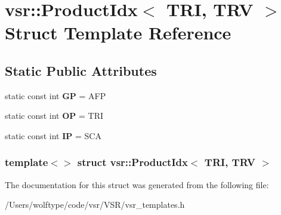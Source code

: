 \hypertarget{structvsr_1_1_product_idx_3_01_t_r_i_00_01_t_r_v_01_4}{\section{vsr\-:\-:Product\-Idx$<$ T\-R\-I, T\-R\-V $>$ Struct Template Reference}
\label{structvsr_1_1_product_idx_3_01_t_r_i_00_01_t_r_v_01_4}
}
\subsection*{Static Public Attributes}
\begin{DoxyCompactItemize}
\item 
\hypertarget{structvsr_1_1_product_idx_3_01_t_r_i_00_01_t_r_v_01_4_a6dcda8d466a3ee99ac435f8e0b77fa0b}{static const int {\bfseries G\-P} = A\-F\-P}\label{structvsr_1_1_product_idx_3_01_t_r_i_00_01_t_r_v_01_4_a6dcda8d466a3ee99ac435f8e0b77fa0b}

\item 
\hypertarget{structvsr_1_1_product_idx_3_01_t_r_i_00_01_t_r_v_01_4_a71e6a5d7023c9c674aba80a5b3c64dd5}{static const int {\bfseries O\-P} = T\-R\-I}\label{structvsr_1_1_product_idx_3_01_t_r_i_00_01_t_r_v_01_4_a71e6a5d7023c9c674aba80a5b3c64dd5}

\item 
\hypertarget{structvsr_1_1_product_idx_3_01_t_r_i_00_01_t_r_v_01_4_a026c27c7f5dd2641f40f61c93899cd9d}{static const int {\bfseries I\-P} = S\-C\-A}\label{structvsr_1_1_product_idx_3_01_t_r_i_00_01_t_r_v_01_4_a026c27c7f5dd2641f40f61c93899cd9d}

\end{DoxyCompactItemize}
\subsubsection*{template$<$$>$ struct vsr\-::\-Product\-Idx$<$ T\-R\-I, T\-R\-V $>$}



The documentation for this struct was generated from the following file\-:\begin{DoxyCompactItemize}
\item 
/\-Users/wolftype/code/vsr/\-V\-S\-R/vsr\-\_\-templates.\-h\end{DoxyCompactItemize}
